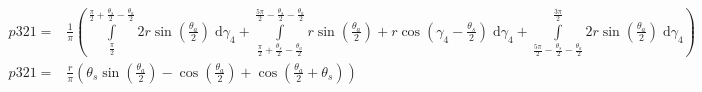 \begin{align}
    p321 =&\frac{1}{\pi} \left(\int\limits_{\frac{\pi}{2}}^{\frac{\pi}{2} + \frac{\theta_{s}}{2} - \frac{\theta_{a}}{2}}2 r \sin{\left (\frac{\theta_{a}}{2} \right )}\;\mathrm{d}\gamma_{4}+\int\limits_{\frac{\pi}{2} + \frac{\theta_{s}}{2} - \frac{\theta_{a}}{2}}^{\frac{5 \pi}{2} - \frac{\theta_{s}}{2} - \frac{\theta_{a}}{2}}r \sin{\left (\frac{\theta_{a}}{2} \right )} + r \cos{\left (\gamma_{4} - \frac{\theta_{s}}{2} \right )}\;\mathrm{d}\gamma_{4}+\int\limits_{\frac{5 \pi}{2} - \frac{\theta_{s}}{2} - \frac{\theta_{a}}{2}}^{\frac{3 \pi}{2}}2 r \sin{\left (\frac{\theta_{a}}{2} \right )}\;\mathrm{d}\gamma_{4}\right)\\
    p321 =& \frac{r}{\pi} \left(\theta_{s} \sin{\left (\frac{\theta_{a}}{2} \right )} - \cos{\left (\frac{\theta_{a}}{2} \right )} + \cos{\left (\frac{\theta_{a}}{2} + \theta_{s} \right )}\right)
\end{align}
